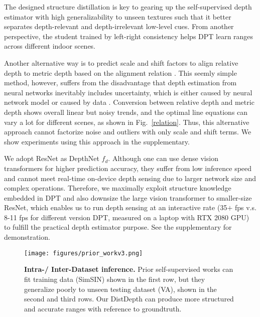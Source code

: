\documentclass[10pt,twocolumn,letterpaper]{article}
\begin{document}
The designed structure distillation is key to gearing up the self-supervised depth estimator with high generalizability to unseen textures such that it better separates depth-relevant and depth-irrelevant low-level cues. From another perspective, the student trained by left-right consistency helps DPT learn ranges across different indoor scenes. 

Another alternative way is to predict scale and shift factors to align relative depth to metric depth based on the alignment relation \cite{Ranftl2020}. This seemly simple method, however, suffers from the disadvantage that depth estimation from neural networks inevitably includes uncertainty, which is either caused by neural network model or caused by data \cite{kendall2017uncertainties, kendall2018multi, maddox2019simple}. Conversion between relative depth and metric depth shows overall linear but noisy trends, and the optimal line equations can vary a lot for different scenes, as shown in Fig.~\ref{relation}. Thus, this alternative approach cannot factorize noise and outliers with only scale and shift terms. We show experiments using this approach in the supplementary.

We adopt ResNet \cite{he2016deep} as DepthNet $f_d$. Although one can use dense vision transformers for higher prediction accuracy, they suffer from low inference speed and cannot meet real-time on-device depth sensing due to larger network size and complex operations. Therefore, we maximally exploit structure knowledge embedded in DPT and also downsize the large vision transformer to smaller-size ResNet, which enables us to run depth sensing at an interactive rate (35$+$ fps v.s. 8-11 fps for different version DPT, measured on a laptop with RTX 2080 GPU) to fulfill the practical depth estimator purpose. See the supplementary for demonstration.

\begin{figure}[bt!]
    \centering
    \texttt{[image: figures/prior\_workv3.png]}
    \vspace{-16pt}
    \caption{\textbf{Intra-/ Inter-Dataset inference.} Prior self-supervised works can fit training data (SimSIN) shown in the first row, but they generalize poorly to unseen testing dataset (VA), shown in the second and third rows. Our DistDepth can produce more structured and accurate ranges with reference to groundtruth.}
    \vspace{-11pt}
    \label{prior_work}
\end{figure}
\end{document}
